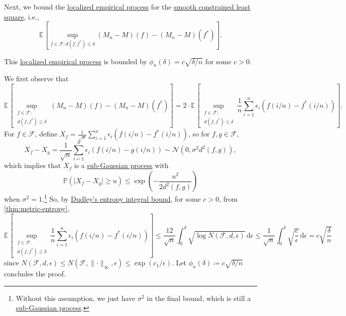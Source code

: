 Next, we bound the \hyperref[def:localized-EP]{localized empirical process} for the \hyperref[prb:smooth-LS]{smooth constrained least square}, i.e.,
\[
	\mathbb{E}_{}\left[\sup _{f\in \mathscr{F} \colon d(f, f^{\ast} ) \leq \delta } (M_n - M)(f) - (M_n - M)(f^{\ast} ) \right].
\]

\begin{claim}
	This \hyperref[def:localized-EP]{localized empirical process} is bounded by \(\phi _n (\delta ) = c \sqrt{\delta / n} \) for some \(c >0\).
\end{claim}
\begin{explanation}
	We first observe that
	\[
		\mathbb{E}_{}\left[\sup _{\substack{f\in \mathscr{F} \colon \\ d(f, f^{\ast} ) \leq \delta } } (M_n - M)(f) - (M_n - M)(f^{\ast} ) \right]
		= 2 \cdot \mathbb{E}_{}\left[\sup _{\substack{f\in \mathscr{F} \colon \\ d(f, f^{\ast} ) \leq \delta } } \frac{1}{n} \sum_{i=1}^{n} \epsilon _i \left( f (i / n) - f^{\ast} (i / n) \right) \right] .
	\]
	For \(f\in \mathscr{F} \), define \(X_f = \frac{1}{\sqrt{n} } \sum_{i=1}^{n} \epsilon _i \left( f (i / n) - f^{\ast} (i / n)  \right) \), so for \(f, g\in \mathscr{F} \),
	\[
		X_f - X_g = \frac{1}{\sqrt{n} } \sum_{i=1}^{n} \epsilon _i \left( f (i / n) - g(i / n)  \right) \sim \mathcal{N} ( 0, \sigma ^2 d^2(f, g) ) ,
	\]
	which implies that \(X_f\) is a \hyperref[def:sub-Gaussian-process]{sub-Gaussian process} with
	\[
		\mathbb{P} ( \vert X_f - X_g \vert \geq u) \leq \exp \left( - \frac{u^2}{2 d^2(f, g)} \right)
	\]
	when \(\sigma ^2 = 1\).\footnote{Without this assumption, we just have \(\sigma ^2\) in the final bound, which is still a \hyperref[def:sub-Gaussian-process]{sub-Gaussian process}.} So, by \hyperref[col:Dudley-integral-entropy-bound]{Dudley's entropy integral bound}, for some \(c> 0\), from \autoref{thm:metric-entropy},
	\[
		\mathbb{E}_{}\left[\sup _{\substack{f\in \mathscr{F} \colon                                                                                              \\ d(f, f^{\ast} ) \leq \delta } } \frac{1}{n} \sum_{i=1}^{n} \epsilon _i \left( f (i / n) - f^{\ast} (i / n) \right) \right]
		\leq \frac{12}{\sqrt{n} } \int_{0}^{\delta } \sqrt{\log N (\mathscr{F} , d, \epsilon )}  \,\mathrm{d}\epsilon
		\leq \frac{1}{\sqrt{n} } \int_{0}^{\delta } \sqrt{\frac{c}{\epsilon } }  \,\mathrm{d}\epsilon = c \sqrt{\frac{\delta}{n}}
	\]
	since \(N(\mathscr{F} , d, \epsilon ) \leq N(\mathscr{F} , \lVert \cdot \rVert _\infty , \epsilon ) \leq \exp (c_1 / \epsilon )\). Let \(\phi _n (\delta ) \coloneqq c \sqrt{\delta / n} \) concludes the proof.
\end{explanation}

